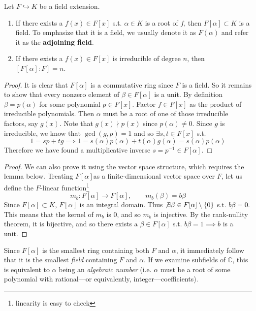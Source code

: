  \begin{theorem}
    Let $F \hookrightarrow K$ be a field extension. 
    \begin{enumerate}
      \item If there exists a $f(x) \in F[x]$ s.t. $\alpha \in K$ is a root of $f$, then $F[\alpha] \subset K$ is a field. To emphasize that it is a field, we usually denote it as $F(\alpha)$ and refer it as the \textbf{adjoining field}. 
      \item If there exists a $f(x) \in F[x]$ is irreducible of degree $n$, then $[F[\alpha]:F] = n$.
    \end{enumerate}
  \end{theorem}
  \begin{proof}
    It is clear that $F[\alpha]$ is a commutative ring since $F$ is a field. So it remains to show that every nonzero element of $\beta \in F[\alpha]$ is a unit. By definition $\beta = p(\alpha)$ for some polynomial $p \in F[x]$.  Factor $f \in F[x]$ as the product of irreducible polynomials. Then $\alpha$ must be a root of one of those irreducible factors, say $g(x)$. Note that $g(x) \nmid p(x)$ since $p(\alpha) \neq 0$. Since $g$ is irreducible, we know that $\gcd(g, p) = 1$ and so $\exists s, t \in F[x]$ s.t. 
    \begin{equation}
      1 = s p + t g \implies 1 = s(\alpha) p(\alpha) + t(\alpha) g(\alpha) = s(\alpha) p(\alpha)
    \end{equation}  
    Therefore we have found a multiplicative inverse $s = p^{-1} \in F[\alpha]$. 
  \end{proof} 
  \begin{proof}
    We can also prove it using the vector space structure, which requires the lemma below. Treating $F[\alpha]$as a finite-dimensional vector space over $F$, let us define the $F$-linear function\footnote{linearity is easy to check}
    \begin{equation}
      m_b: F[\alpha] \rightarrow F[\alpha], \qquad m_b (\beta) = b\beta
    \end{equation} 
    Since $F[\alpha] \subset K$, $F[\alpha]$ is an integral domain. Thus $\not\exists \beta \in F[\alpha] \setminus \{0\}$ s.t. $b \beta = 0$. This means that the kernel of $m_b$ is $0$, and so $m_b$ is injective. By the rank-nullity theorem, it is bijective, and so there exists a $\beta \in F[\alpha]$ s.t. $b \beta = 1 \implies b$ is a unit. 
  \end{proof} 

  Since $F[\alpha]$ is the smallest ring containing both $F$ and $\alpha$, it immediately follow that it is the smallest \textit{field} containing $F$ and $\alpha$. If we examine subfields of $\mathbb{C}$, this is equivalent to $\alpha$ being an \textit{algebraic number} (i.e. $\alpha$ must be a root of some polynomial with rational---or equivalently, integer---coefficients). 

